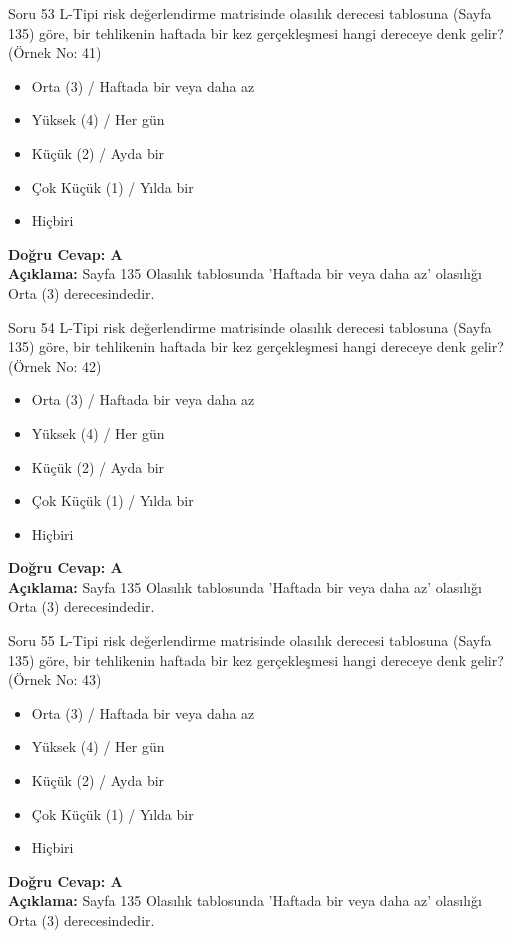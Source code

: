 \documentclass[12pt,a4paper]{article}
\begin{document}
\begin{testcard}{Soru 53}
    L-Tipi risk değerlendirme matrisinde olasılık derecesi tablosuna (Sayfa 135) göre, bir tehlikenin haftada bir kez gerçekleşmesi hangi dereceye denk gelir? (Örnek No: 41)
    \begin{itemize}
        \item[A)] Orta (3) / Haftada bir veya daha az
        \item[B)] Yüksek (4) / Her gün
        \item[C)] Küçük (2) / Ayda bir
        \item[D)] Çok Küçük (1) / Yılda bir
        \item[E)] Hiçbiri
    \end{itemize}
    \tcblower
    \textbf{Doğru Cevap: A} \\
    \textbf{Açıklama:} Sayfa 135 Olasılık tablosunda 'Haftada bir veya daha az' olasılığı Orta (3) derecesindedir.
\end{testcard}

\begin{testcard}{Soru 54}
    L-Tipi risk değerlendirme matrisinde olasılık derecesi tablosuna (Sayfa 135) göre, bir tehlikenin haftada bir kez gerçekleşmesi hangi dereceye denk gelir? (Örnek No: 42)
    \begin{itemize}
        \item[A)] Orta (3) / Haftada bir veya daha az
        \item[B)] Yüksek (4) / Her gün
        \item[C)] Küçük (2) / Ayda bir
        \item[D)] Çok Küçük (1) / Yılda bir
        \item[E)] Hiçbiri
    \end{itemize}
    \tcblower
    \textbf{Doğru Cevap: A} \\
    \textbf{Açıklama:} Sayfa 135 Olasılık tablosunda 'Haftada bir veya daha az' olasılığı Orta (3) derecesindedir.
\end{testcard}

\begin{testcard}{Soru 55}
    L-Tipi risk değerlendirme matrisinde olasılık derecesi tablosuna (Sayfa 135) göre, bir tehlikenin haftada bir kez gerçekleşmesi hangi dereceye denk gelir? (Örnek No: 43)
    \begin{itemize}
        \item[A)] Orta (3) / Haftada bir veya daha az
        \item[B)] Yüksek (4) / Her gün
        \item[C)] Küçük (2) / Ayda bir
        \item[D)] Çok Küçük (1) / Yılda bir
        \item[E)] Hiçbiri
    \end{itemize}
    \tcblower
    \textbf{Doğru Cevap: A} \\
    \textbf{Açıklama:} Sayfa 135 Olasılık tablosunda 'Haftada bir veya daha az' olasılığı Orta (3) derecesindedir.
\end{testcard}
\end{document}
